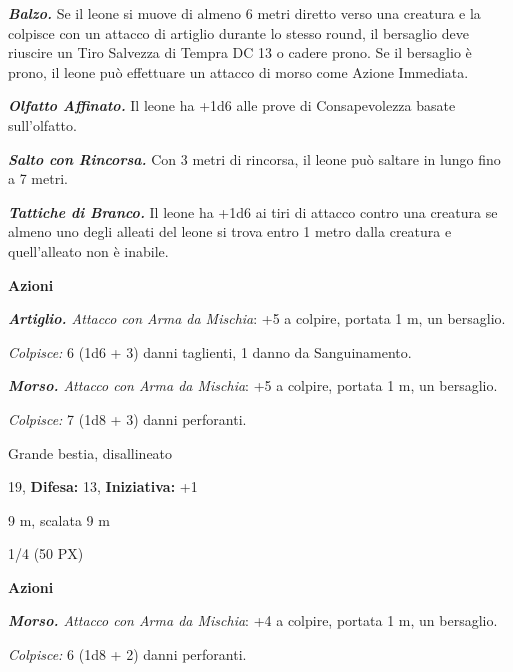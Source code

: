 \begin{multicols}{2}
{\emph{\textbf{Balzo.}} Se il leone si muove di almeno 6 metri diretto verso una creatura e la colpisce con un attacco di artiglio durante lo stesso round, il bersaglio deve riuscire un Tiro Salvezza di Tempra DC 13 o cadere prono. Se il bersaglio è prono, il leone può effettuare un attacco di morso come Azione Immediata.

\emph{\textbf{Olfatto Affinato.}} Il leone ha +1d6 alle prove di Consapevolezza basate sull'olfatto.

\emph{\textbf{Salto con Rincorsa.}} Con 3 metri di rincorsa, il leone può saltare in lungo fino a 7 metri.

\emph{\textbf{Tattiche di Branco.}} Il leone ha +1d6 ai tiri di attacco contro una creatura se almeno uno degli alleati del leone si trova entro 1 metro dalla creatura e quell'alleato non è inabile.

\textbf{Azioni}

\emph{\textbf{Artiglio.} Attacco con Arma da Mischia}: +5 a colpire, portata 1 m, un bersaglio.

\emph{Colpisce:} 6 (1d6 + 3) danni taglienti, 1 danno da Sanguinamento.

\emph{\textbf{Morso.} Attacco con Arma da Mischia}: +5 a colpire, portata 1 m, un bersaglio.

\emph{Colpisce:} 7 (1d8 + 3) danni perforanti.

\begin{description}[noitemsep, topsep=0pt, parsep=0pt, partopsep=0pt, leftmargin=0cm, labelwidth=2.2cm]
    \item[\textbf{Taglia/Tipo:}] Grande bestia, disallineato
    \item[\textbf{Caratt.:}] 
    \item[\textbf{Punti Ferita:}] 19,  \textbf{Difesa:} 13,  \textbf{Iniziativa:} +1
    \item[\textbf{Tiri Salvez.:}] 
    \item[\textbf{Movimento:}] 9 m, scalata 9 m
    \item[\textbf{Sfida:}] 1/4 (50 PX)\smallskip
\end{description}

\textbf{Azioni}

\emph{\textbf{Morso.} Attacco con Arma da Mischia}: +4 a colpire, portata 1 m, un bersaglio.

\emph{Colpisce:} 6 (1d8 + 2) danni perforanti.

}
\end{multicols}
